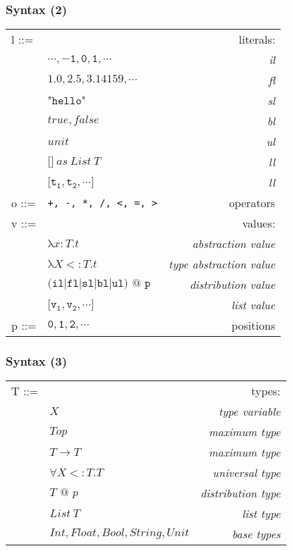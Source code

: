 \documentclass{beamer}
\newcommand{\ty}{{:}}
\newcommand{\su}{{<:}}
\newcommand{\tlb}{\texttt{[}}
\newcommand{\trb}{\texttt{]}}
\begin{document}
\begin{frame}[fragile]
  \frametitle{Syntax (2)}
  \centering
  \begin{tabular}{llr}
      l ::= &  & literals: \\
      & $\mathtt{\cdots, -1, 0, 1, \cdots}$ & \textit{il} \\
      & $\mathtt{1.0, 2.5, 3.14159, \cdots}$ & \textit{fl} \\
      & $\texttt{"hello"}$ & \textit{sl} \\
      & $true, false$ & \textit{bl} \\
      & $unit$ & \textit{ul} \\
      & $\texttt{[]}~as~List~T$ & \textit{ll} \\
      & $\mathtt{\tlb t_1, t_2, \cdots\trb}$ & \textit{ll} \\
      o ::= & \verb|+, -, *, /, <, =, >| & operators \\
      v ::= &  & values: \\
      & $\texttt{λ}x\ty T.t$ & \textit{abstraction value} \\
      & $\texttt{λ}X\su T.t$ & \textit{type abstraction value} \\
      & $\texttt{(il|fl|sl|bl|ul) @ p}$ & \textit{distribution value} \\
      & $\mathtt{\tlb v_1, v_2, \cdots\trb}$ & \textit{list value} \\
      p ::= & $\mathtt{0, 1, 2, \cdots}$ & positions \\
  \end{tabular}

\end{frame}

\begin{frame}[fragile]
  \frametitle{Syntax (3)}
  \centering
  \begin{tabular}{llr}
      T ::= &  & types: \\
      & $X$ & \textit{type variable} \\
      & $Top$ & \textit{maximum type} \\
      & $T\to T$ & \textit{maximum type} \\
      & $\texttt{∀}X\su T.T$ & \textit{universal type} \\
      & $T\texttt{ @ }p$ & \textit{distribution type} \\
      & $List~T$ & \textit{list type} \\ 
      & $Int, Float, Bool, String, Unit$ & \textit{base types} \\
  \end{tabular}

\end{frame}
\end{document}
